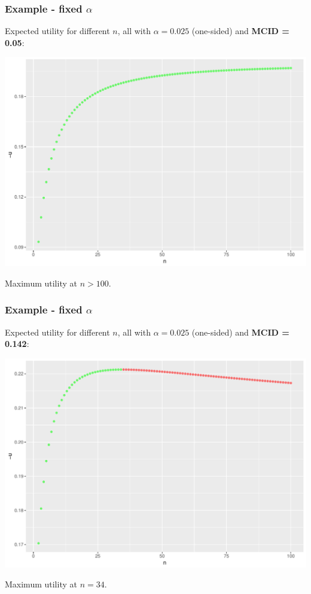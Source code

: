 \documentclass{beamer}
\begin{document}
\begin{frame}
\frametitle{Example - fixed $\alpha$}
Expected utility for different $n$, all with $\alpha = 0.025$ (one-sided) and \textbf{MCID = 0.05}:

\centering
\includegraphics[scale=0.4]{fix_a_05}

Maximum utility at $n > 100 $.
\end{frame}


\begin{frame}
\frametitle{Example - fixed $\alpha$}
Expected utility for different $n$, all with $\alpha = 0.025$ (one-sided) and \textbf{MCID = 0.142}:

\centering
\includegraphics[scale=0.4]{fix_a_142}

Maximum utility at $n = 34 $.
\end{frame}
\end{document}
